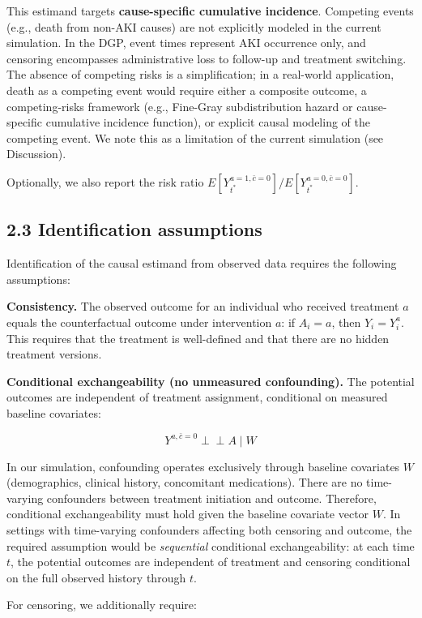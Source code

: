 \documentclass[
  letterpaper,
  DIV=11,
  numbers=noendperiod]{scrartcl}
\begin{document}
This estimand targets \textbf{cause-specific cumulative incidence}.
Competing events (e.g., death from non-AKI causes) are not explicitly
modeled in the current simulation. In the DGP, event times represent AKI
occurrence only, and censoring encompasses administrative loss to
follow-up and treatment switching. The absence of competing risks is a
simplification; in a real-world application, death as a competing event
would require either a composite outcome, a competing-risks framework
(e.g., Fine-Gray subdistribution hazard or cause-specific cumulative
incidence function), or explicit causal modeling of the competing event.
We note this as a limitation of the current simulation (see Discussion).

Optionally, we also report the risk ratio
\(E[Y_{t^*}^{a=1, \bar{c}=0}] / E[Y_{t^*}^{a=0, \bar{c}=0}]\).

\subsection{2.3 Identification
assumptions}\label{identification-assumptions}

Identification of the causal estimand from observed data requires the
following assumptions:

\textbf{Consistency.} The observed outcome for an individual who
received treatment \(a\) equals the counterfactual outcome under
intervention \(a\): if \(A_i = a\), then \(Y_i = Y_i^{a}\). This
requires that the treatment is well-defined and that there are no hidden
treatment versions.

\textbf{Conditional exchangeability (no unmeasured confounding).} The
potential outcomes are independent of treatment assignment, conditional
on measured baseline covariates:

\[Y^{a, \bar{c}=0} \perp\!\!\!\perp A \mid W\]

In our simulation, confounding operates exclusively through baseline
covariates \(W\) (demographics, clinical history, concomitant
medications). There are no time-varying confounders between treatment
initiation and outcome. Therefore, conditional exchangeability must hold
given the baseline covariate vector \(W\). In settings with time-varying
confounders affecting both censoring and outcome, the required
assumption would be \emph{sequential} conditional exchangeability: at
each time \(t\), the potential outcomes are independent of treatment and
censoring conditional on the full observed history through \(t\).

For censoring, we additionally require:
\end{document}
